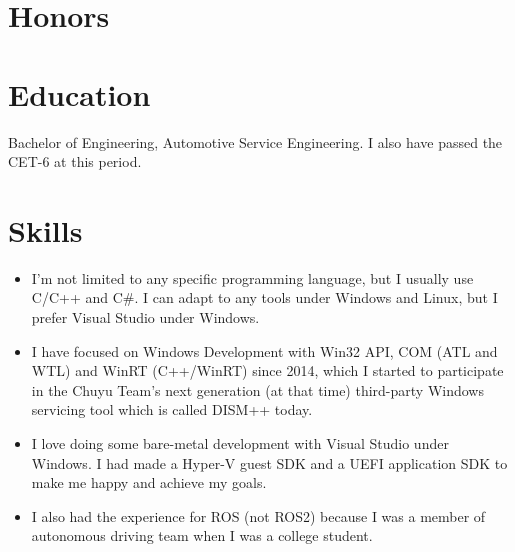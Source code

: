 \documentclass{resume}
\begin{document}
\section{Honors}


\section{Education}

  Bachelor of Engineering, Automotive Service Engineering. I also have passed the CET-6 at this period.

\section{Skills}
\begin{itemize}
  \item I'm not limited to any specific programming language, but I usually use C/C++ and C\#. I can adapt to any tools under Windows and Linux, but I prefer Visual Studio under Windows.
  \item I have focused on Windows Development with Win32 API, COM (ATL and WTL) and WinRT (C++/WinRT) since 2014, which I started to participate in the Chuyu Team's next generation (at that time) third-party Windows servicing tool which is called DISM++ today.
  \item I love doing some bare-metal development with Visual Studio under Windows. I had made a Hyper-V guest SDK and a UEFI application SDK to make me happy and achieve my goals.
  \item I also had the experience for ROS (not ROS2) because I was a member of autonomous driving team when I was a college student.
\end{itemize}
\end{document}
